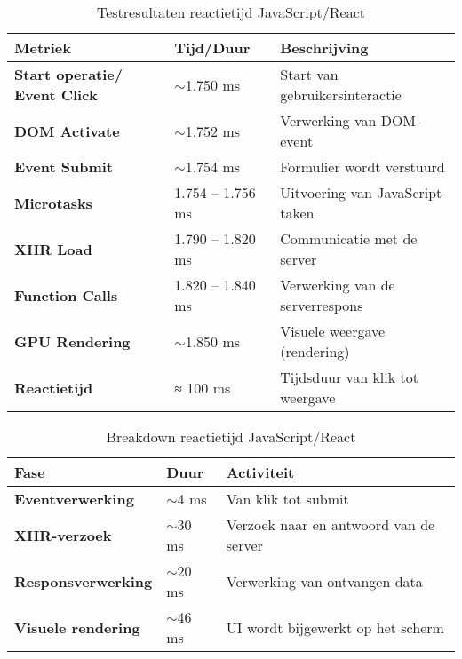 \begin{table}[H]
    \centering
    \begin{tabular}{ |p{5cm}|p{3cm}|p{6cm}|}
        \hline
        \textbf{Metriek} & \textbf{Tijd/Duur} & \textbf{Beschrijving}\\
        \hline
        \textbf{Start operatie/ Event Click}  & $\sim$1.750 ms & Start van gebruikersinteractie \\
        \hline
        \textbf{\gls{DOM} Activate} & $\sim$1.752 ms & Verwerking van DOM-event \\
        \hline
        \textbf{Event Submit}  & $\sim$1.754 ms & Formulier wordt verstuurd \\
        \hline
        \textbf{Microtasks}  & 1.754 – 1.756 ms & Uitvoering van JavaScript-taken \\
        \hline                       
        \textbf{\gls{XHR} Load}  & 1.790 – 1.820 ms & Communicatie met de server  \\
        \hline
        \textbf{Function Calls}  & 1.820 – 1.840 ms & Verwerking van de serverrespons \\
        \hline
        \textbf{GPU Rendering}  & $\sim$1.850 ms & 	Visuele weergave (rendering) \\
        \hline
        \textbf{Reactietijd}  & ≈ 100 ms & 	Tijdsduur van klik tot weergave \\
        \hline
    \end{tabular}
    \caption[\centering Testresultaten reactietijd JavaScript/React]{\label{tab:Testresultaten JS reactietijd}Testresultaten reactietijd JavaScript/React}
\end{table}

\begin{table}[H]
    \centering
    \begin{tabular}{ |p{5cm}|p{3cm}|p{6cm}|}
        \hline
        \textbf{Fase} & \textbf{Duur} & \textbf{Activiteit}\\
        \hline
        \textbf{Eventverwerking}  & $\sim$4 ms & Van klik tot submit \\
        \hline
        \textbf{\gls{XHR}-verzoek} & $\sim$30 ms & Verzoek naar en antwoord van de server \\
        \hline
        \textbf{Responsverwerking}  & $\sim$20 ms & Verwerking van ontvangen data \\
        \hline
        \textbf{Visuele rendering}  & $\sim$46 ms & \gls{UI} wordt bijgewerkt op het scherm \\
        \hline                       

    \end{tabular}
    \caption[\centering Breakdown reactietijd JavaScript/React]{\label{tab:breakdown JS reactietijd}Breakdown reactietijd JavaScript/React}
\end{table}



